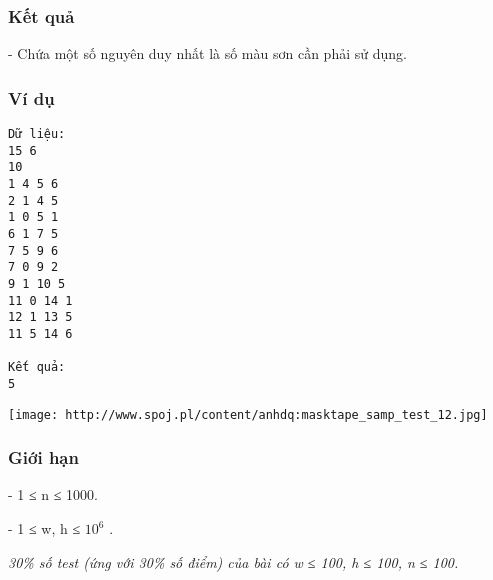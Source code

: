 \subsubsection{   Kết quả  }

   - Chứa một số nguyên duy nhất là số màu sơn cần phải sử dụng.  

\subsubsection{   Ví dụ  }
\begin{verbatim}
Dữ liệu:
15 6
10
1 4 5 6
2 1 4 5
1 0 5 1
6 1 7 5
7 5 9 6
7 0 9 2
9 1 10 5
11 0 14 1
12 1 13 5
11 5 14 6

Kết quả:
5
\end{verbatim}
\texttt{[image: http://www.spoj.pl/content/anhdq:masktape\_samp\_test\_12.jpg]}

\subsubsection{   Giới hạn  }

   - 1 ≤ n ≤ 1000.   


   - 1 ≤ w, h ≤ $10^{6}$   .   


\textit{     30\% số test (ứng với 30\% số điểm) của bài có  w ≤ 100, h ≤ 100, n ≤ 100.    }
